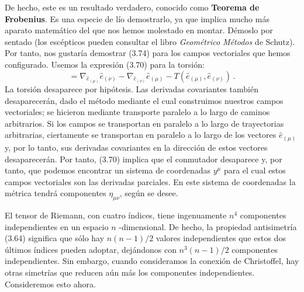 \documentclass[11pt,b5paper,openany,twoside]{book}
\newcommand{\mn}{{\mu\nu}}
\newcommand{\e}[1]{\hat{e}_{(#1)}}
\begin{document}
De hecho, este es un resultado verdadero, conocido como {\bf Teorema de Frobenius}.
Es una especie de lío demostrarlo, ya que implica mucho más aparato matemático del que nos hemos molestado en montar.
Démoslo por sentado (los escépticos pueden consultar el libro {\sl Geométrico Métodos} de Schutz).
Por tanto, nos gustaría demostrar (3.74) para los campos vectoriales que hemos configurado.
Usemos la expresión (3.70) para la torsión:
\begin{equation}
[\e\mu,\e\nu] = \nabla_{\e\mu} \e\nu - \nabla_{\e\nu}\e\mu
- T(\e\mu,\e\nu)\,.\label{3.75}
\end{equation}
La torsión desaparece por hipótesis.
Las derivadas covariantes también desaparecerán, dado el método mediante el cual construimos nuestros campos vectoriales; se hicieron mediante transporte paralelo a lo largo de caminos arbitrarios.
Si los campos se transportan en paralelo a lo largo de trayectorias arbitrarias, ciertamente se transportan en paralelo a lo largo de los vectores $\e\mu$ y, por lo tanto, sus derivadas covariantes en la dirección de estos vectores desaparecerán.
Por tanto, (3.70) implica que el conmutador desaparece y, por tanto, que podemos encontrar un sistema de coordenadas $y^\mu$ para el cual estos campos vectoriales son las derivadas parciales.
En este sistema de coordenadas la métrica tendrá componentes $\eta_\mn$, según se desee.

El tensor de Riemann, con cuatro índices, tiene ingenuamente $n^4$ componentes independientes en un espacio $n$ -dimensional.
De hecho, la propiedad antisimetría (3.64) significa que sólo hay $n(n-1)/2$ valores independientes que estos dos últimos índices pueden adoptar, dejándonos con $n^3(n-1)/2$ componentes independientes.
Sin embargo, cuando consideramos la conexión de Christoffel, hay otras simetrías que reducen aún más los componentes independientes.
Consideremos esto ahora.
\end{document}
